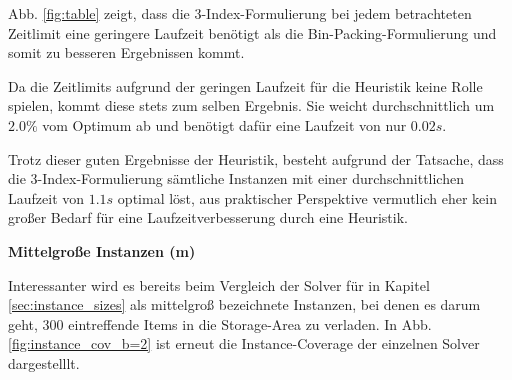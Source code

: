 Abb. \ref{fig:table} zeigt, dass die 3-Index-Formulierung bei jedem betrachteten Zeitlimit eine geringere Laufzeit benötigt
als die Bin-Packing-Formulierung und somit zu besseren Ergebnissen kommt.

Da die Zeitlimits aufgrund der geringen Laufzeit für die Heuristik keine Rolle spielen, kommt diese stets zum selben Ergebnis.
Sie weicht durchschnittlich um $2.0 \%$ vom Optimum ab und benötigt dafür eine Laufzeit von nur $0.02s$.

Trotz dieser guten Ergebnisse der Heuristik, besteht aufgrund der Tatsache, dass die 3-Index-Formulierung sämtliche Instanzen
mit einer durchschnittlichen Laufzeit von $1.1s$ optimal löst, aus praktischer Perspektive vermutlich eher kein großer Bedarf für
eine Laufzeitverbesserung durch eine Heuristik.

\textbf{Mittelgroße Instanzen (m)}

Interessanter wird es bereits beim Vergleich der Solver für in Kapitel \ref{sec:instance_sizes} als mittelgroß bezeichnete Instanzen,
bei denen es darum geht, $300$ eintreffende Items in die Storage-Area zu verladen.
In Abb. \ref{fig:instance_cov_b=2} ist erneut die Instance-Coverage der einzelnen Solver dargestelllt.

